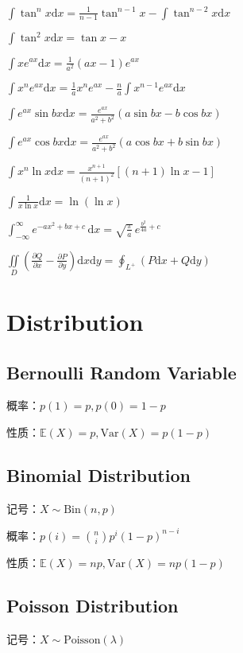 \documentclass[9pt,landscape]{article}
\begin{document}
\begin{multicols}{3}
$ \int \tan ^{n}x{\mbox{d}}x={\frac {1}{n-1}}\tan ^{n-1}x-\int \tan ^{n-2}x{\mbox{d}}x\quad $

$ \int \tan ^{2}x{\mbox{d}}x=\tan x-x $

$ \int xe^{ax}{\mbox{d}}x={\frac {1}{a^{2}}}(ax-1)e^{ax} $

$ \int x^{n}e^{ax}{\mbox{d}}x={\frac {1}{a}}x^{n}e^{ax}-{\frac {n}{a}}\int x^{n-1}e^{ax}{\mbox{d}}x $

$ \int e^{ax}\sin bx{\mbox{d}}x={\frac {e^{ax}}{a^{2}+b^{2}}}(a\sin bx-b\cos bx) $

$ \int e^{ax}\cos bx{\mbox{d}}x={\frac {e^{ax}}{a^{2}+b^{2}}}(a\cos bx+b\sin bx) $

$ \int x^{n}\ln x{\mbox{d}}x={\frac {x^{n+1}}{(n+1)^{2}}}[(n+1)\ln x-1] $

$ \int {\frac {1}{x\ln {x}}}{\mbox{d}}x=\ln {(\ln {x})} $

$ \int _{-\infty }^{\infty }e^{-ax^{2}+bx+c}\,\mathrm{d}x={\sqrt {\frac {\pi }{a}}}\,e^{{\frac {b^{2}}{4a}}+c} $

$ \iint \limits _{D}\left({\frac {\partial Q}{\partial x}}-{\frac {\partial P}{\partial y}}\right)\mathrm {d} x\mathrm {d} y=\oint _{L^{+}}(P\mathrm {d} x+Q\mathrm {d} y) $

\section{Distribution}

\subsection{Bernoulli Random Variable}

概率：$p(1)=p, p(0)=1-p$

性质：$\mathbb{E}(X)=p,\text{Var}(X)=p(1-p)$

\subsection{Binomial Distribution}
记号：$X\sim \mathrm{Bin}(n,p)$

概率：$p(i)=\binom{n}{i}p^i(1-p)^{n-i}$

性质：$\mathbb{E}(X)=np,\text{Var}(X)=np(1-p)$

\subsection{Poisson Distribution}

记号：$X \sim \text{Poisson}(\lambda)$


\end{multicols}
\end{document}
